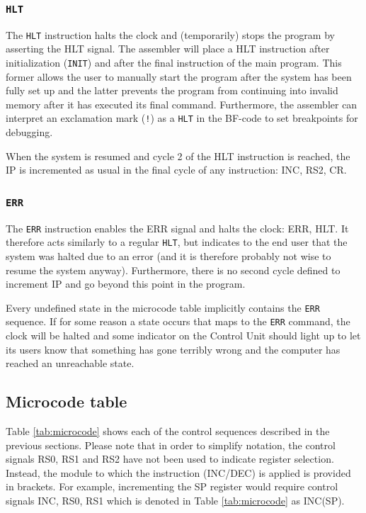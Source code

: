 \subsubsection{\texttt{HLT}}
The \texttt{HLT} instruction halts the clock and (temporarily) stops the program by asserting the HLT signal. The assembler will place a HLT instruction after initialization (\texttt{INIT}) and after the final instruction of the main program. This former allows the user to manually start the program after the system has been fully set up and the latter prevents the program from continuing into invalid memory after it has executed its final command. Furthermore, the assembler can interpret an exclamation mark (\texttt{!}) as a \texttt{HLT} in the BF-code to set breakpoints for debugging.

When the system is resumed and cycle 2 of the HLT instruction is reached, the IP is incremented as usual in the final cycle of any instruction: INC, RS2, CR.

\subsubsection{\texttt{ERR}}
The \texttt{ERR} instruction enables the ERR signal and halts the clock: ERR, HLT. It therefore acts similarly to a regular \texttt{HLT}, but indicates to the end user that the system was halted due to an error (and it is therefore probably not wise to resume the system anyway). Furthermore, there is no second cycle defined to increment IP and go beyond this point in the program.

Every undefined state in the microcode table implicitly contains the \texttt{ERR} sequence. If for some reason a state occurs that maps to the \texttt{ERR} command, the clock will be halted and some indicator on the Control Unit should light up to let its users know that something has gone terribly wrong and the computer has reached an unreachable state.

\subsection{Microcode table}
Table \ref{tab:microcode} shows each of the control sequences described in the previous sections. Please note that in order to simplify notation, the control signals RS0, RS1 and RS2 have not been used to indicate register selection. Instead, the module to which the instruction (INC/DEC) is applied is provided in brackets. For example, incrementing the SP register would require control signals INC, RS0, RS1 which is denoted in Table \ref{tab:microcode} as INC(SP).
\newpage





